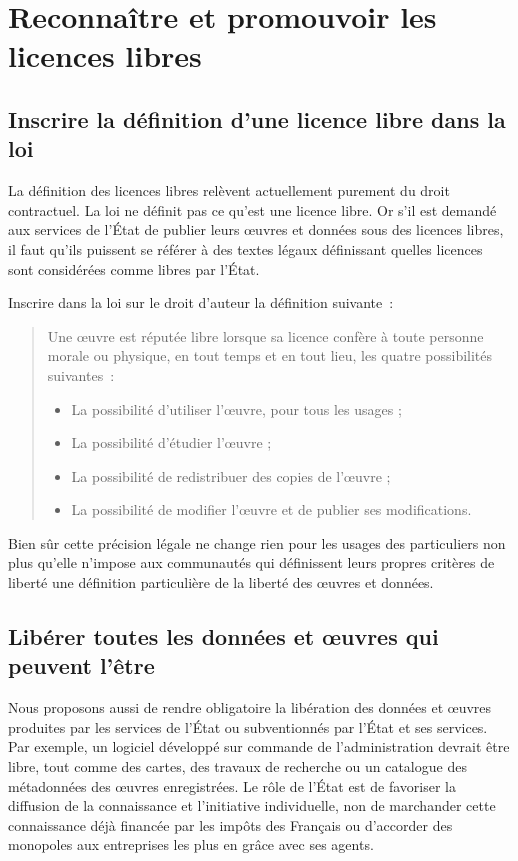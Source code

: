 \chapter{Reconnaître et promouvoir les licences libres}\label{licencelibre}

\section{Inscrire la définition d'une licence libre dans la loi}
La définition des licences libres relèvent actuellement purement du droit contractuel. La loi ne définit pas ce qu'est une licence libre. Or s'il est demandé aux services de l'État de publier leurs œuvres et données sous des licences libres, il faut qu'ils puissent se référer à des textes légaux définissant quelles licences sont considérées comme libres par l'État.

\begin{mesure}
Inscrire dans la loi sur le droit d'auteur la définition suivante~:

\begin{quotation}
Une œuvre est réputée libre lorsque sa licence confère à toute personne morale ou physique, en tout temps et en tout lieu, les quatre possibilités suivantes~:
\begin{itemize}
\item La possibilité d'utiliser l'œuvre, pour tous les usages ;
\item La possibilité d'étudier l'œuvre ;
\item La possibilité de redistribuer des copies de l'œuvre ;
\item La possibilité de modifier l'œuvre et de publier ses modifications.
\end{itemize}
\end{quotation}
\end{mesure}

Bien sûr cette précision légale ne change rien pour les usages des particuliers non plus qu'elle n'impose aux communautés qui définissent leurs propres critères de liberté une définition particulière de la liberté des œuvres et données.

\section{Libérer toutes les données et œuvres qui peuvent l'être}
Nous proposons aussi de rendre obligatoire la libération des données et œuvres produites par les services de l'État ou subventionnés par l'État et ses services. Par exemple, un logiciel développé sur commande de l'administration devrait être libre, tout comme des cartes, des travaux de recherche ou un catalogue des métadonnées des œuvres enregistrées. Le rôle de l'État est de favoriser la diffusion de la connaissance et l'initiative individuelle, non de marchander cette connaissance déjà financée par les impôts des Français ou d'accorder des monopoles aux entreprises les plus en grâce avec ses agents. 

